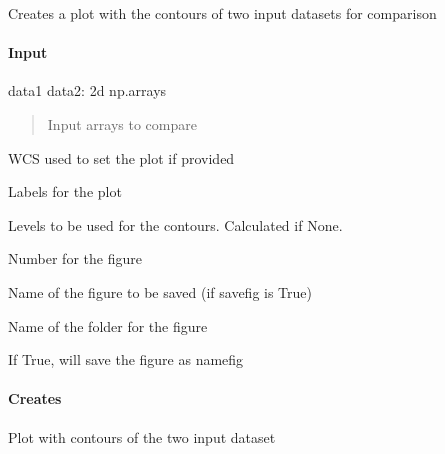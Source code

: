 \documentclass[letterpaper,10pt,english]{sphinxmanual}
\begin{document}
\begin{fulllineitems}
\label{\detokenize{api/pymusepipe:pymusepipe.graph_pipe.plot_compare_contours}}
\pysigstartsignatures
{}
\pysigstopsignatures
\sphinxAtStartPar
Creates a plot with the contours of two input datasets for comparison


\paragraph{Input}
\label{\detokenize{api/pymusepipe:id79}}
\sphinxAtStartPar
data1
data2: 2d np.arrays
\begin{quote}

\sphinxAtStartPar
Input arrays to compare
\end{quote}
\begin{description}
\sphinxAtStartPar
WCS used to set the plot if provided

\sphinxAtStartPar
Labels for the plot

\sphinxAtStartPar
Levels to be used for the contours. Calculated if None.

\sphinxAtStartPar
Number for the figure

\sphinxAtStartPar
Name of the figure to be saved (if savefig is True)

\sphinxAtStartPar
Name of the folder for the figure

\sphinxAtStartPar
If True, will save the figure as namefig

\end{description}


\paragraph{Creates}
\label{\detokenize{api/pymusepipe:id80}}
\sphinxAtStartPar
Plot with contours of the two input dataset

\end{fulllineitems}
\end{document}
